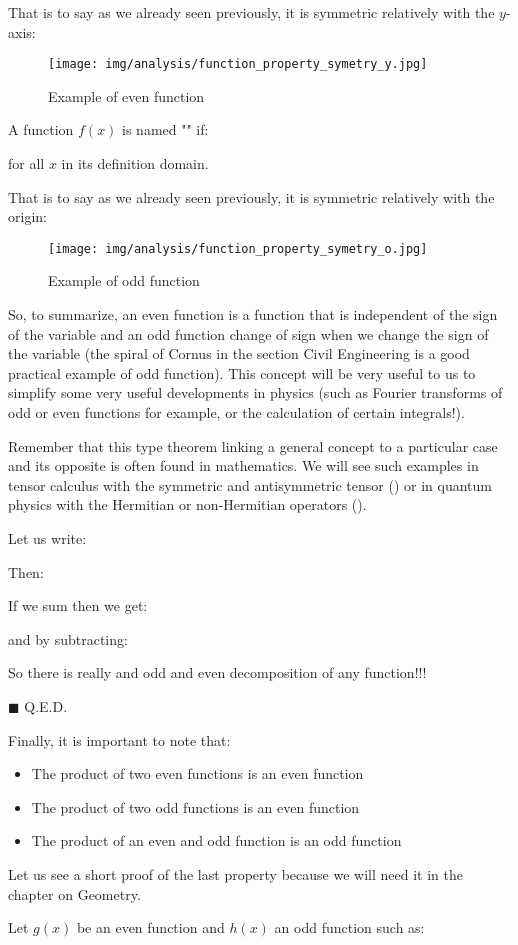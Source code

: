 \begin{enumerate}
		That is to say as we already seen previously, it is symmetric relatively with the $y$-axis:
		\begin{figure}[H]
			\centering
			\texttt{[image: img/analysis/function\_property\_symetry\_y.jpg]}
			\caption{Example of even function}
		\end{figure}
		A function $f (x)$ is named "\label{odd function}" if:
		
		for all $x$ in its definition domain.
		
		That is to say as we already seen previously, it is symmetric relatively with the origin:
		\begin{figure}[H]
			\centering	\texttt{[image: img/analysis/function\_property\_symetry\_o.jpg]}
			\caption{Example of odd function}
		\end{figure}
		So, to summarize, an even function is a function that is independent of the sign of the variable and an odd function change of sign when we change the sign of the variable (the spiral of Cornus in the section Civil Engineering is a good practical example of odd function). This concept will be very useful to us to simplify some very useful developments in physics (such as Fourier transforms of odd or even functions for example, or the calculation of certain integrals!).
		\begin{theorem}
		Remember that this type theorem linking a general concept to a particular case and its opposite is often found in mathematics. We will see such examples in tensor calculus with the symmetric and antisymmetric tensor () or in quantum physics with the Hermitian or non-Hermitian operators ().
		\end{theorem}
		\begin{dem}
		Let us write:
		
		Then:
		
		If we sum then we get:
		
		and by subtracting:
		
		So there is really and odd and even decomposition of any function!!!
		\begin{flushright}
			$\blacksquare$  Q.E.D.
		\end{flushright}
		\end{dem}
		Finally, it is important to note that:
		\begin{itemize}
			\item The product of two even functions is an even function
			\item The product of two odd functions is an even function
			\item The product of an even and odd function is an odd function
		\end{itemize}
		Let us see a short proof of the last property because we will need it in the chapter on Geometry.
		\begin{dem}
		Let $g(x)$ be an even function and $h(x)$ an odd function such as:
		

\end{dem}
\end{enumerate}
